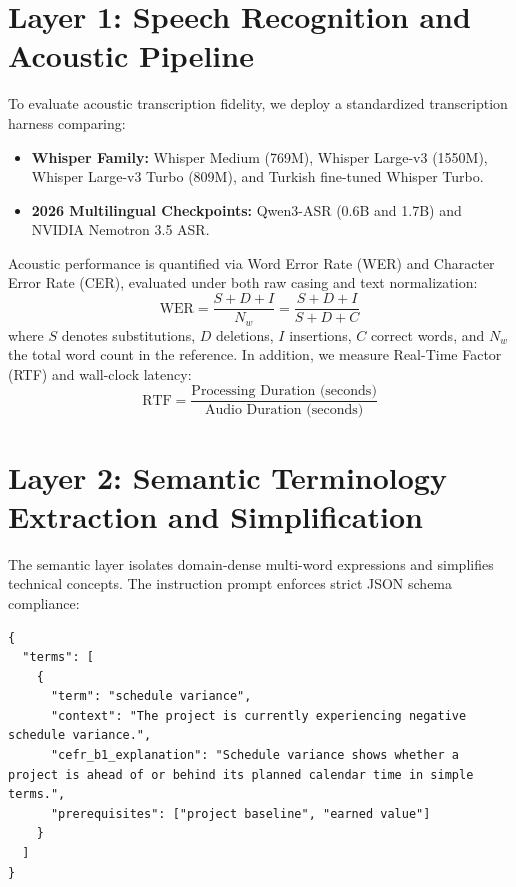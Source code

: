 \documentclass[a4paper,12pt]{report}
\begin{document}
\section{Layer 1: Speech Recognition and Acoustic Pipeline}
To evaluate acoustic transcription fidelity, we deploy a standardized transcription harness comparing:
\begin{itemize}
    \item \textbf{Whisper Family:} Whisper Medium (769M), Whisper Large-v3 (1550M), Whisper Large-v3 Turbo (809M), and Turkish fine-tuned Whisper Turbo.
    \item \textbf{2026 Multilingual Checkpoints:} Qwen3-ASR (0.6B and 1.7B) and NVIDIA Nemotron 3.5 ASR.
\end{itemize}

Acoustic performance is quantified via Word Error Rate (WER) and Character Error Rate (CER), evaluated under both raw casing and text normalization:
\begin{equation}
\text{WER} = \frac{S + D + I}{N_w} = \frac{S + D + I}{S + D + C}
\end{equation}
where $S$ denotes substitutions, $D$ deletions, $I$ insertions, $C$ correct words, and $N_w$ the total word count in the reference. In addition, we measure Real-Time Factor (RTF) and wall-clock latency:
\begin{equation}
\text{RTF} = \frac{\text{Processing Duration (seconds)}}{\text{Audio Duration (seconds)}}
\end{equation}

\section{Layer 2: Semantic Terminology Extraction and Simplification}
The semantic layer isolates domain-dense multi-word expressions and simplifies technical concepts. The instruction prompt enforces strict JSON schema compliance:

\begin{lstlisting}
{
  "terms": [
    {
      "term": "schedule variance",
      "context": "The project is currently experiencing negative schedule variance.",
      "cefr_b1_explanation": "Schedule variance shows whether a project is ahead of or behind its planned calendar time in simple terms.",
      "prerequisites": ["project baseline", "earned value"]
    }
  ]
}
\end{lstlisting}
\end{document}
